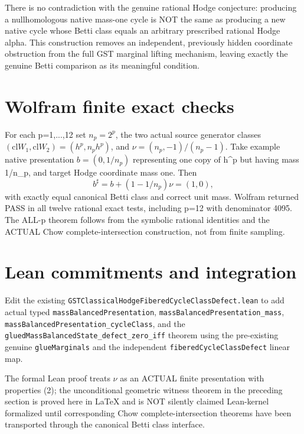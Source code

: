\documentclass[11pt]{article}
\newcommand{\cl}{\mathrm{cl}}
\begin{document}
There is no contradiction with the genuine
rational Hodge conjecture: producing a
nullhomologous native mass-one cycle is NOT
the same as producing a new native cycle whose
Betti class equals an arbitrary prescribed
rational Hodge alpha. This construction removes
an independent, previously hidden coordinate
obstruction from the full GST marginal lifting
mechanism, leaving exactly the genuine Betti
comparison as its meaningful condition.

\section{Wolfram finite exact checks}
For each p=1,...,12 set \(n_p=2^p\),
the two actual source generator classes
\((\cl W_1,\cl W_2)=(h^p,n_p h^p)\),
and \(\nu=(n_p,-1)/(n_p-1)\).
Take example native presentation
\(b=(0,1/n_p)\) representing one copy of h^p
but having mass 1/n_p, and target Hodge
coordinate mass one. Then
\[
 b^\sharp=b+(1-1/n_p)\nu=(1,0),
\]
with exactly equal canonical Betti class and
correct unit mass. Wolfram returned PASS in
all twelve rational exact tests, including
p=12 with denominator 4095. The ALL-p theorem
follows from the symbolic rational identities
and the ACTUAL Chow complete-intersection
construction, not from finite sampling.

\section{Lean commitments and integration}
Edit the existing
\texttt{GSTClassicalHodgeFiberedCycleClassDefect.lean}
to add actual typed
\texttt{massBalancedPresentation},
\texttt{massBalancedPresentation_mass},
\texttt{massBalancedPresentation_cycleClass},
and the
\texttt{gluedMassBalancedState_defect_zero_iff}
theorem using the pre-existing genuine
\texttt{glueMarginals} and the independent
\texttt{fiberedCycleClassDefect} linear map.

The formal Lean proof treats \(\nu\) as an ACTUAL
finite presentation with properties (2);
the unconditional geometric witness theorem in
the preceding section is proved here in LaTeX
and is NOT silently claimed Lean-kernel formalized
until corresponding Chow complete-intersection
theorems have been transported through the
canonical Betti class interface.
\end{document}
